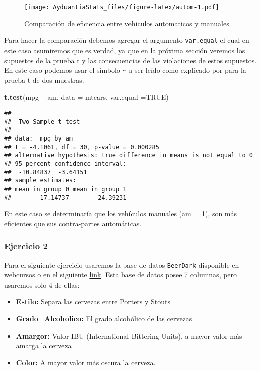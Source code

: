 \documentclass[]{book}
\newenvironment{Shaded}{\begin{snugshade}}{\end{snugshade}}
\newcommand{\DataTypeTok}[1]{\textcolor[rgb]{0.13,0.29,0.53}{#1}}
\newcommand{\KeywordTok}[1]{\textcolor[rgb]{0.13,0.29,0.53}{\textbf{#1}}}
\newcommand{\NormalTok}[1]{#1}
\newcommand{\OperatorTok}[1]{\textcolor[rgb]{0.81,0.36,0.00}{\textbf{#1}}}
\newcommand{\OtherTok}[1]{\textcolor[rgb]{0.56,0.35,0.01}{#1}}
\newcommand{\StringTok}[1]{\textcolor[rgb]{0.31,0.60,0.02}{#1}}
\providecommand{\tightlist}{%
  \setlength{\itemsep}{0pt}\setlength{\parskip}{0pt}}
\begin{document}
\begin{figure}
\centering
\texttt{[image: AyduantiaStats\_files/figure-latex/autom-1.pdf]}
\caption{\label{fig:autom}Comparación de eficiencia entre vehiculos automaticos y manuales}
\end{figure}

Para hacer la comparación debemos agregar el argumento \texttt{var.equal} el cual en este caso asumiremos que es verdad, ya que en la próxima sección veremos los supuestos de la prueba t y las consecuencias de las violaciones de estos supuestos. En este caso podemos usar el símbolo \texttt{\textasciitilde{}} a ser leído como explicado por para la prueba t de dos muestras.

\begin{Shaded}
\begin{Highlighting}[]
\KeywordTok{t.test}\NormalTok{(mpg }\OperatorTok{~}\StringTok{ }\NormalTok{am, }\DataTypeTok{data =}\NormalTok{ mtcars, }\DataTypeTok{var.equal =}\OtherTok{TRUE}\NormalTok{)}
\end{Highlighting}
\end{Shaded}

\begin{verbatim}
## 
##  Two Sample t-test
## 
## data:  mpg by am
## t = -4.1061, df = 30, p-value = 0.000285
## alternative hypothesis: true difference in means is not equal to 0
## 95 percent confidence interval:
##  -10.84837  -3.64151
## sample estimates:
## mean in group 0 mean in group 1 
##        17.14737        24.39231
\end{verbatim}

En este caso se determinaría que los vehículos manuales (am = 1), son más eficientes que sus contra-partes automáticas.

\hypertarget{ejercicio-2}{%
\subsubsection{Ejercicio 2}\label{ejercicio-2}}

Para el siguiente ejercicio usaremos la base de datos \texttt{BeerDark} disponible en webcursos o en el siguiente \href{https://archive.org/download/BeerDark/BeerDark.csv}{link}. Esta base de datos posee 7 columnas, pero usaremos solo 4 de ellas:

\begin{itemize}
\tightlist
\item
  \textbf{Estilo:} Separa las cervezas entre Porters y Stouts
\item
  \textbf{Grado\_Alcoholico:} El grado alcohólico de las cervezas
\item
  \textbf{Amargor:} Valor IBU (International Bittering Units), a mayor valor más amarga la cerveza
\item
  \textbf{Color:} A mayor valor más oscura la cerveza.
\end{itemize}
\end{document}

